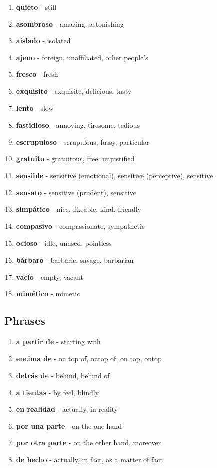 \documentclass[12pt]{article}
\begin{document}
\begin{enumerate}
                \item \textbf{quieto} - still
                \item \textbf{asombroso} - amazing, astonishing
                \item \textbf{aislado} - isolated
                \item \textbf{ajeno} - foreign, unaffiliated, other people's
                \item \textbf{fresco} - fresh
                \item \textbf{exquisito} - exquisite, delicious, tasty
                \item \textbf{lento} - slow
                \item \textbf{fastidioso} - annoying, tiresome, tedious
                \item \textbf{escrupuloso} - scrupulous, fussy, particular
                \item \textbf{gratuito} - gratuitous, free, unjustified
                \item \textbf{sensible} - sensitive (emotional), sensitive (perceptive), sensitive
                \item \textbf{sensato} - sensitive (prudent), sensitive
                \item \textbf{simpático} - nice, likeable, kind, friendly
                \item \textbf{compasivo} - compassionate, sympathetic
                \item \textbf{ocioso} - idle, unused, pointless
                \item \textbf{bárbaro} - barbaric, savage, barbarian
                \item \textbf{vacío} - empty, vacant
                \item \textbf{mimético} - mimetic
            \end{enumerate}
        \subsection{Phrases}
            \begin{enumerate}
                \item \textbf{a partir de} - starting with
                \item \textbf{encima de} - on top of, ontop of, on top, ontop
                \item \textbf{detrás de} - behind, behind of
                \item \textbf{a tientas} - by feel, blindly
                \item \textbf{en realidad} - actually, in reality
                \item \textbf{por una parte} - on the one hand
                \item \textbf{por otra parte} - on the other hand, moreover
                \item \textbf{de hecho} - actually, in fact, as a matter of fact
            \end{enumerate}
\end{document}
